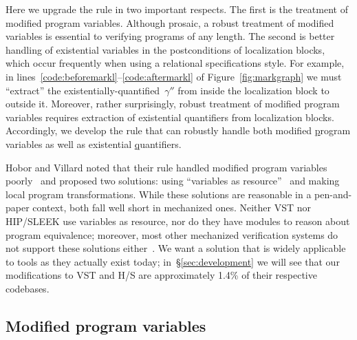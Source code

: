 Here we upgrade the  rule in two important respects.  The first is the treatment of modified program variables.  Although prosaic, a robust treatment of modified variables is essential to verifying programs of any length.  The second is better handling of existential variables in the postconditions of localization blocks, which occur frequently when using a relational specifications style.  For example, in lines~\ref{code:beforemarkl}--\ref{code:aftermarkl} of Figure~\ref{fig:markgraph} we must ``extract'' the existentially-quantified~$\gamma''$ from inside the localization block to outside it.  Moreover, rather surprisingly, robust treatment of modified program variables requires extraction of existential quantifiers from localization blocks.  Accordingly, we develop the  rule that can robustly handle both modified \underline{p}rogram variables as well as existential \underline{q}uantifiers.

Hobor and Villard noted that their  rule handled modified program variables poorly~\cite{hobor:ramification} and proposed two solutions: using ``variables as resource''~\cite{bornat:var} and making local program transformations.  While these solutions are reasonable in a pen-and-paper context, both fall well short in mechanized ones.  Neither VST nor HIP/SLEEK use variables as resource, nor do they have modules to reason about program equivalence; moreover, most other mechanized verification systems do not support these solutions either~\cite{Beckert:2007,DistefanoP08,bengtson:charge}.  We want a solution that is widely applicable to tools as they actually exist today; in~\S\ref{sec:development} we will see that our modifications to VST and H/S are approximately 1.4\% of their respective codebases.

\subsection{Modified program variables}
\label{sec:freevars}

